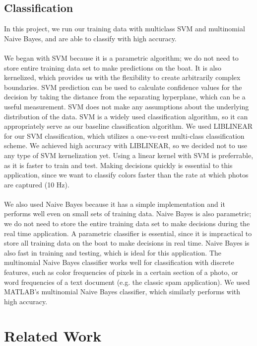 \documentclass{article} %
\begin{document}
\subsection{Classification}
In this project, we run our training data with multiclass SVM and multinomial Naive Bayes, and are able to classify with high accuracy. \\\\
We began with SVM because it is a parametric algorithm; we do not need to store entire 
training data set to make predictions on the boat. It is also kernelized, which provides us with the flexibility to
create arbitrarily complex boundaries. SVM prediction can be used to calculate confidence values for the
decision by taking the distance from the separating hyperplane, which can be a useful measurement. SVM does not make any assumptions about the underlying distribution of the data. SVM is a widely used classification algorithm, so it can appropriately serve as our baseline classification algorithm. We used LIBLINEAR for our SVM classification, which utilizes a one-vs-rest multi-class classification scheme. We achieved high accuracy with LIBLINEAR, so we decided not to use any type of SVM kernelization yet. Using a linear kernel with SVM is preferrable, as it is faster to train and test. Making decisions quickly is essential to this application, since we want to classify colors faster than the rate at which photos are captured (10 Hz).\\\\
We also used Naive Bayes because it has a simple implementation and it performs well even on small sets of training data. Naive Bayes is also parametric; we do not need to store the entire training data set to make decisions during the real time application. A parametric classifier is essential, since it is impractical to store all training data on the boat to make decisions in real time. Naive Bayes is also fast in training and testing, which is ideal for this application. The multinomial Naive Bayes classifier works well for classification with discrete features, such as color frequencies of pixels in a certain section of a photo, or word frequencies of a text document (e.g. the classic spam application). We used MATLAB's multinomial Naive Bayes classifier, which similarly performs with high accuracy.

\section{Related Work}
\end{document}
